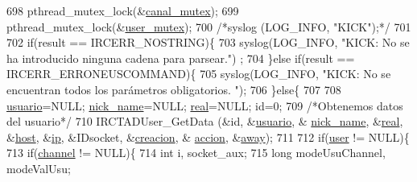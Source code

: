 \begin{DoxyCode}
{{{{{{{{{{698                         pthread\_mutex\_lock(&\hyperlink{_g-2361-06-_p1-_server_8c_ab86a544a49de18195048bac54dd3ac3e}{canal\_mutex});
699                         pthread\_mutex\_lock(&\hyperlink{_g-2361-06-_p1-_server_8c_a5dedd07a1144d2ab70b74a8e64b6a7c0}{user\_mutex});
700                         \textcolor{comment}{/*syslog (LOG\_INFO, "KICK");*/}
701 
702                         \textcolor{keywordflow}{if}(result == IRCERR\_NOSTRING)\{
703                                 syslog(LOG\_INFO, \textcolor{stringliteral}{"KICK: No se ha introducido ninguna cadena para parsear."})
      ;
704                         \}\textcolor{keywordflow}{else} \textcolor{keywordflow}{if}(result == IRCERR\_ERRONEUSCOMMAND)\{
705                                 syslog(LOG\_INFO, \textcolor{stringliteral}{"KICK: No se encuentran todos los parámetros obligatorios.
      "});
706                         \}\textcolor{keywordflow}{else}\{
707 
708                                 \hyperlink{_g-2361-06-_p1-_server_8c_a0147a5b81499984f9cb00379a8cb84af}{usuario}=NULL; \hyperlink{_g-2361-06-_p1-_server_8c_aabbf66718cda228b924a4a9441eadf62}{nick\_name}=NULL; 
      \hyperlink{_g-2361-06-_p1-_server_8c_af832f551e1c343666c3d2a55834139a0}{real}=NULL; \textcolor{keywordtype}{id}=0;
709                                 \textcolor{comment}{/*Obtenemos datos del usuario*/}
710                                 IRCTADUser\_GetData (&\textcolor{keywordtype}{id}, &\hyperlink{_g-2361-06-_p1-_server_8c_a0147a5b81499984f9cb00379a8cb84af}{usuario}, &
      \hyperlink{_g-2361-06-_p1-_server_8c_aabbf66718cda228b924a4a9441eadf62}{nick\_name}, &\hyperlink{_g-2361-06-_p1-_server_8c_af832f551e1c343666c3d2a55834139a0}{real}, &\hyperlink{_g-2361-06-_p1-_server_8c_a1c2046dcb30a629d6d9f45ff8f403f12}{host}, &\hyperlink{_g-2361-06-_p1-_server_8c_afbc356cd0e25d1dbbece7c10fd025fa6}{ip}, &IDsocket, &\hyperlink{_g-2361-06-_p1-_server_8c_a26292066ca0d17922eadee4161542ab9}{creacion}, &
      \hyperlink{_g-2361-06-_p1-_server_8c_a93e785c991445d8b8ee99c2e51242d5a}{accion}, &\hyperlink{_g-2361-06-_p1-_server_8c_adf86742e21384f58f8999d8317e6a370}{away});
711 
712                                 \textcolor{keywordflow}{if}(\hyperlink{_g-2361-06-_p1-_server_8c_a14871705f45ccdc5bb9f4549efd8e119}{user} != NULL)\{
713                                         \textcolor{keywordflow}{if}(\hyperlink{_g-2361-06-_p1-_server_8c_a842ca2f026578e5c479c095ff3335969}{channel} != NULL)\{
714                                                 \textcolor{keywordtype}{int} i, socket\_aux;
715                                                 \textcolor{keywordtype}{long} modeUsuChannel, modeValUsu;
}}}}}}}}}}
\end{DoxyCode}
